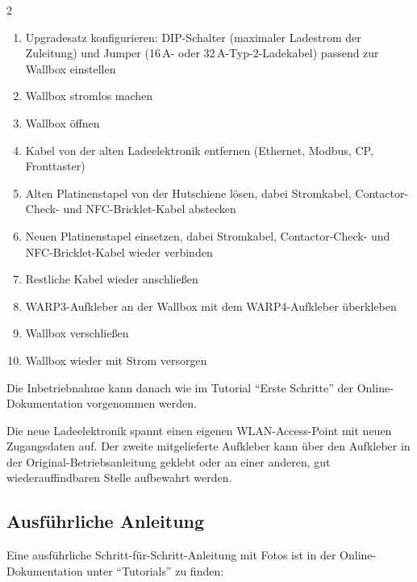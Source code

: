 \documentclass[a4paper,10pt]{article}
\newcommand{\hint}[1]{\begin{tcolorbox}[colback=boxgray,colframe=black,coltext=
white,title=Hinweis,left*=2mm,right*=2mm,boxsep=1mm,bottom=1mm,top=1mm]#1\end{tcolorbox}}
\begin{document}
\begin{multicols*}{2}
	\begin{enumerate}[nosep,leftmargin=*]
		\item Upgradesatz konfigurieren: DIP-Schalter (maximaler Ladestrom der
		      Zuleitung) und Jumper (16\,A- oder 32\,A-Typ-2-Ladekabel) passend
		      zur Wallbox einstellen
		\item Wallbox stromlos machen
		\item Wallbox öffnen
		\item Kabel von der alten Ladeelektronik entfernen (Ethernet, Modbus, CP,
		      Fronttaster)
		\item Alten Platinenstapel von der Hutschiene lösen, dabei Stromkabel,
		      Contactor-Check- und NFC-Bricklet-Kabel abstecken
		\item Neuen Platinenstapel einsetzen, dabei Stromkabel, Contactor-Check-
		      und NFC-Bricklet-Kabel wieder verbinden
		\item Restliche Kabel wieder anschließen
		\item WARP3-Aufkleber an der Wallbox mit dem WARP4-Aufkleber überkleben
		\item Wallbox verschließen
		\item Wallbox wieder mit Strom versorgen
	\end{enumerate}

	Die Inbetriebnahme kann danach wie im Tutorial \enquote{Erste Schritte} der
	Online-Dokumentation vorgenommen werden.

	\hint{Die neue Ladeelektronik spannt einen eigenen WLAN-Access-Point mit neuen
		Zugangsdaten auf. Der zweite mitgelieferte Aufkleber kann über den Aufkleber
		in der Original-Betriebsanleitung geklebt oder an einer anderen, gut
		wiederauffindbaren Stelle aufbewahrt werden.}

	\subsection*{Ausführliche Anleitung}
	Eine ausführliche Schritt-für-Schritt-Anleitung mit Fotos ist in der
	Online-Dokumentation unter \enquote{Tutorials} zu finden:


\end{multicols*}
\end{document}
